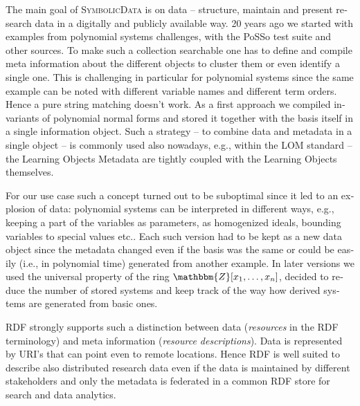 \documentclass[11pt]{article}
\def\SD{\textsc{SymbolicData}}
\begin{document}
\begin{otherlanguage}{english}
\begin{multicols}{2}

The main goal of {\SD} is on data -- structure, maintain and present research
data in a digitally and publicly available way. 20 years ago we started with
examples from polynomial systems challenges, with the PoSSo test suite and
other sources. To make such a collection searchable one has to define and
compile meta information about the different objects to cluster them or even
identify a single one. This is challenging in particular for polynomial systems
since the same example can be noted with different variable names and different
term orders.  Hence a pure string matching doesn't work.  As a first approach
we compiled invariants of polynomial normal forms and stored it together with
the basis itself in a single information object.  Such a strategy -- to combine
data and metadata in a single object -- is commonly used also nowadays, e.g.,
within the LOM standard -- the Learning Objects Metadata are tightly coupled
with the Learning Objects themselves.

For our use case such a concept turned out to be suboptimal since it led to an
explosion of data: polynomial systems can be interpreted in different ways,
e.g., keeping a part of the variables as parameters, as homogenized ideals,
bounding variables to special values etc.. Each such version had to be kept as
a new data object since the metadata changed even if the basis was the same or
could be easily (i.e., in polynomial time) generated from another example. In
later versions we used the universal property of the ring
$\mathbbm{Z}[x_1,\dots,x_n]$, decided to reduce the number of stored systems
and keep track of the way how derived systems are generated from basic ones.

RDF strongly supports such a distinction between data (\emph{resources} in the
RDF terminology) and meta information (\emph{resource descriptions}). Data is
represented by URI's that can point even to remote locations.  Hence RDF is
well suited to describe also distributed research data even if the data is
maintained by different stakeholders and only the metadata is federated in a
common RDF store for search and data analytics.


\end{multicols}
\end{otherlanguage}
\end{document}
